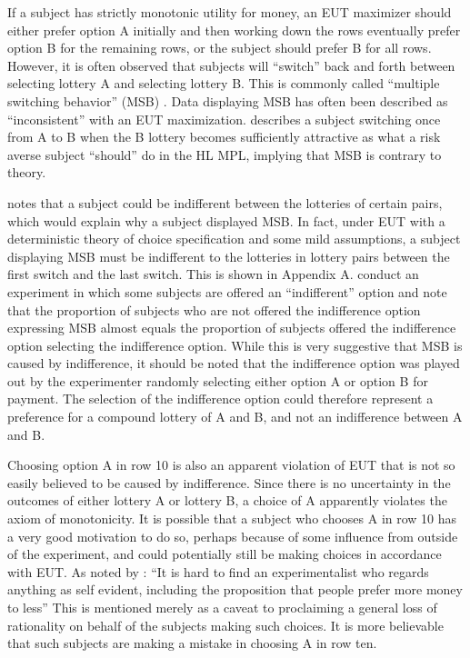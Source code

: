 \documentclass[../main.tex]{subfiles}
\begin{document}
If a subject has strictly monotonic utility for money, an EUT maximizer should either prefer option A initially and then working down the rows eventually prefer option B for the remaining rows, or the subject should prefer B for all rows.
However, it is often observed that subjects will \enquote{switch} back and forth between selecting lottery A and selecting lottery B.
This is commonly called \enquote{multiple switching behavior} (MSB) \parencite{Bruner2011}.
Data displaying MSB has often been described as \enquote{inconsistent} with an EUT maximization.
\textcite[1645]{Holt2002} describes a subject switching once from A to B when the B lottery becomes sufficiently attractive as what a risk averse subject \enquote{should} do in the HL MPL, implying that MSB is contrary to theory.


\textcite[347]{Harrison2007} notes that a subject could be indifferent between the lotteries of certain pairs, which would explain why a subject displayed MSB.
In fact, under EUT with a deterministic theory of choice specification and some mild assumptions, a subject displaying MSB must be indifferent to the lotteries in lottery pairs between the first switch and the last switch.
This is shown in Appendix A.
\textcite{Harrison2007} conduct an experiment in which some subjects are offered an \enquote{indifferent} option and note that the proportion of subjects who are not offered the indifference option expressing MSB almost equals the proportion of subjects offered the indifference option  selecting the indifference option.
While this is very suggestive that MSB is caused by indifference, it should be noted that the indifference option was played out by the experimenter randomly selecting either option A or option B for payment.
The selection of the indifference option could  therefore represent a preference for a compound lottery of A and B, and not an indifference between A and B.


Choosing option A in row 10 is also an apparent violation of EUT that is not so easily believed to be caused by indifference.
Since there is no uncertainty in the outcomes of either lottery A or lottery B, a choice of A apparently violates the axiom of monotonicity.
It is possible that a subject who chooses A in row 10 has a very good motivation to do so, perhaps because of some influence from outside of the experiment, and could potentially still be making choices in accordance with EUT.
As noted by \textcite[930]{Smith1982}: \enquote{It is hard to find an experimentalist who regards anything as self evident, including the proposition that people prefer more money to less}
This is mentioned merely as a caveat to proclaiming a general loss of rationality on behalf of the subjects making such choices. It is more believable that such subjects are making a mistake in choosing A in row ten.
\end{document}
